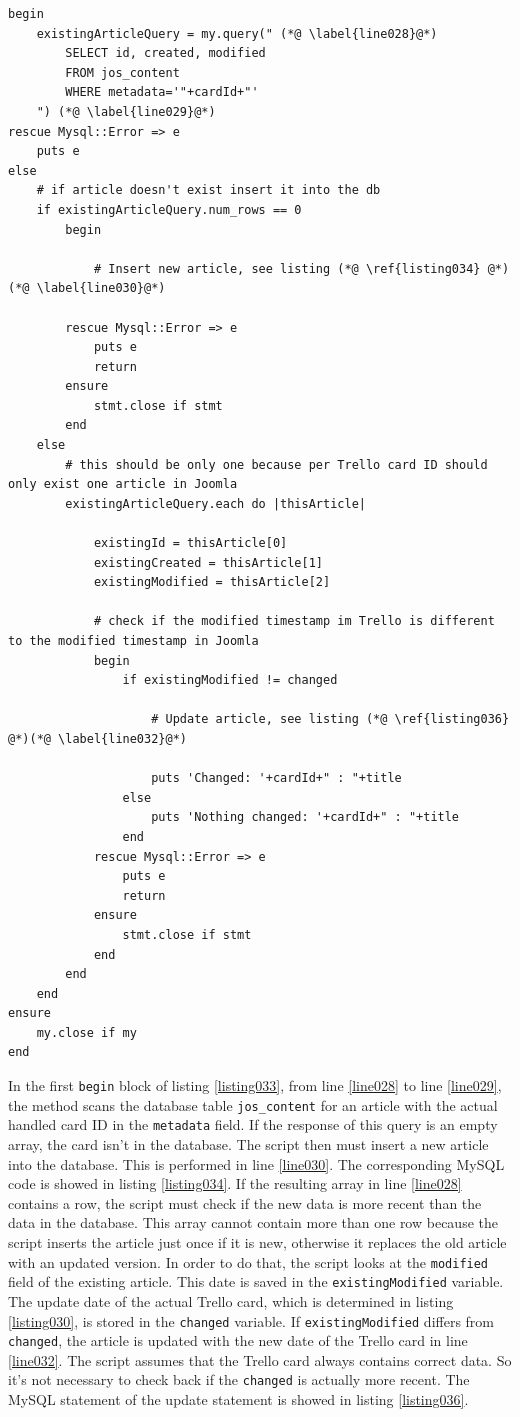 \begin{lstlisting}[aboveskip=1\baselineskip, caption=\texttt{joomlaMultiple.rb} usage., label=listing033]
begin  
	existingArticleQuery = my.query(" (*@ \label{line028}@*)
		SELECT id, created, modified
		FROM jos_content 
		WHERE metadata='"+cardId+"'
	") (*@ \label{line029}@*)
rescue Mysql::Error => e
	puts e
else
	# if article doesn't exist insert it into the db
	if existingArticleQuery.num_rows == 0
		begin
			
			# Insert new article, see listing (*@ \ref{listing034} @*)(*@ \label{line030}@*)
			
		rescue Mysql::Error => e
			puts e
			return
		ensure
			stmt.close if stmt
		end			
	else
		# this should be only one because per Trello card ID should only exist one article in Joomla
		existingArticleQuery.each do |thisArticle|
			
			existingId = thisArticle[0]
			existingCreated = thisArticle[1]
			existingModified = thisArticle[2]
			
			# check if the modified timestamp im Trello is different to the modified timestamp in Joomla
			begin 
				if existingModified != changed
					
					# Update article, see listing (*@ \ref{listing036} @*)(*@ \label{line032}@*)
					
					puts 'Changed: '+cardId+" : "+title
				else 
					puts 'Nothing changed: '+cardId+" : "+title
				end					
			rescue Mysql::Error => e
				puts e
				return
			ensure
				stmt.close if stmt
			end
		end
	end	
ensure
	my.close if my
end
\end{lstlisting}

In the first \lstinline{begin} block of listing \ref{listing033}, from line \ref{line028} to line \ref{line029}, the method scans the database table \lstinline{jos_content} for an article with the actual handled card ID in the \lstinline{metadata} field. If the response of this query is an empty array, the card isn't in the database. The script then must insert a new article into the database. This is performed in line \ref{line030}. The corresponding MySQL code is showed in listing \ref{listing034}. If the resulting array in line \ref{line028} contains a row, the script must check if the new data is more recent than the data in the database. This array cannot contain more than one row because the script inserts the article just once if it is new, otherwise it replaces the old article with an updated version. In order to do that, the script looks at the \lstinline{modified} field of the existing article. This date is saved in the \lstinline{existingModified} variable. The update date of the actual Trello card, which is determined in listing \ref{listing030}, is stored in the \lstinline{changed} variable. If \lstinline{existingModified} differs from \lstinline{changed}, the article is updated with the new date of the Trello card in line \ref{line032}. The script assumes that the Trello card always contains correct data. So it's not necessary to check back if the \lstinline{changed} is actually more recent. The MySQL statement of the update statement is showed in listing \ref{listing036}.

